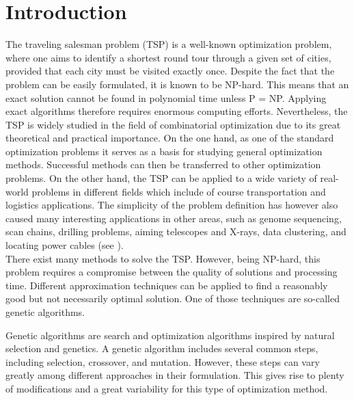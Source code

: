 \section{Introduction}
\label{sec:introduction}

The traveling salesman problem (TSP) is a well-known optimization problem, where one aims to identify a shortest round tour through a given set of cities, provided that each city must be visited exactly once. Despite the fact that the problem can be easily formulated, it is known to be NP-hard. This means that an exact solution cannot be found in polynomial time unless P = NP. Applying exact algorithms therefore requires enormous computing efforts. Nevertheless, the TSP is widely studied in the field of combinatorial optimization due to its great theoretical and practical importance. On the one hand, as one of the standard optimization problems it serves as a basis for studying general optimization methods. Successful methods can then be transferred to other optimization problems. On the other hand, the TSP can be applied to a wide variety of real-world problems in different fields which include of course transportation and logistics applications. The simplicity of the problem definition has however also caused many interesting applications in other areas, such as genome sequencing, scan chains, drilling problems, aiming telescopes and X-rays, data clustering, and locating power cables (see \cite{applegate2006traveling}). \\

There exist many methods to solve the TSP. However, being NP-hard, this problem requires a compromise between the quality of solutions and processing time. Different approximation techniques can be applied to find a reasonably good but not necessarily optimal solution. One of those techniques are so-called genetic algorithms. \par 

Genetic algorithms are search and optimization algorithms inspired by natural selection and genetics. A genetic algorithm includes several common steps, including selection, crossover, and mutation. However, these steps can vary greatly among different approaches in their formulation. This gives rise to plenty of modifications and a great variability for this type of optimization method. \par

